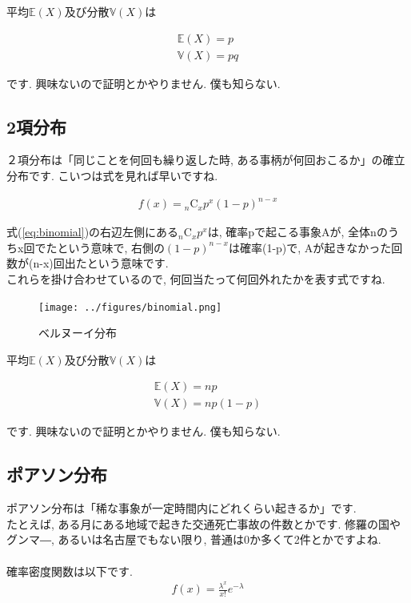 \documentclass[11pt,a4paper,uplatex]{ujreport} 	%
\begin{document}
平均$\mathbb{E}(X)$及び分散$\mathbb{V}(X)$は

\begin{align}
\mathbb{E}(X) = p\\
\mathbb{V}(X) = pq
\end{align}

です. 興味ないので証明とかやりません. 僕も知らない.
\subsection{2項分布}
２項分布は「同じことを何回も繰り返した時, ある事柄が何回おこるか」の確立分布です. こいつは式を見れば早いですね.

\begin{align}
\label{eq:binomial}
f(x) = {}_n\mathrm{C}_x p^x(1-p)^{n-x}
\end{align}

式(\ref{eq:binomial})の右辺左側にある${}_n\mathrm{C}_x p^x$は, 確率pで起こる事象Aが, 全体nのうちx回でたという意味で, 右側の$(1-p)^{n-x}$は確率(1-p)で, Aが起きなかった回数が(n-x)回出たという意味です.\\

これらを掛け合わせているので, 何回当たって何回外れたかを表す式ですね.

\begin{figure}[H]
\label{im:bernoulli}
  \centering
  \texttt{[image: ../figures/binomial.png]}
  \caption{ベルヌーイ分布}
\end{figure}

平均$\mathbb{E}(X)$及び分散$\mathbb{V}(X)$は

\begin{align}
\mathbb{E}(X) = np\\
\mathbb{V}(X) = np(1-p)
\end{align}

です. 興味ないので証明とかやりません. 僕も知らない.

\subsection{ポアソン分布}
ポアソン分布は「稀な事象が一定時間内にどれくらい起きるか」です.\\

たとえば, ある月にある地域で起きた交通死亡事故の件数とかです. 修羅の国やグンマ―, あるいは名古屋でもない限り, 普通は0か多くて2件とかですよね.\\
\\

確率密度関数は以下です.
\begin{align}
f(x) = \frac{\lambda^x}{x!}e^{-\lambda}
\end{align}
\end{document}
